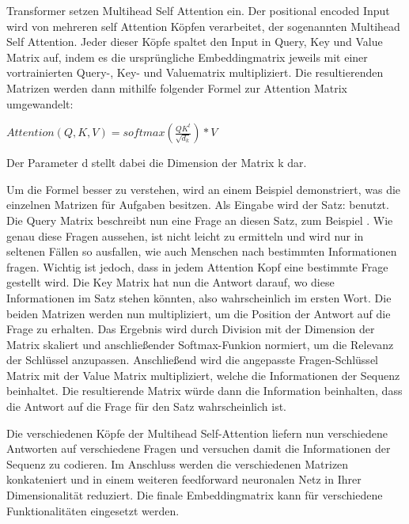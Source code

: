Transformer setzen Multihead Self Attention ein. 
Der positional encoded Input wird von mehreren self Attention Köpfen verarbeitet, der sogenannten Multihead Self Attention. 
Jeder dieser Köpfe spaltet den Input in Query, Key und Value Matrix auf, indem es die ursprüngliche Embeddingmatrix jeweils mit einer vortrainierten Query-, Key- und Valuematrix multipliziert.
Die resultierenden Matrizen werden dann mithilfe folgender Formel zur Attention Matrix umgewandelt:

$Attention(Q,K,V)=softmax(\frac{QK^t}{\sqrt{d_k}})*V$

Der Parameter d stellt dabei die Dimension der Matrix k dar.

Um die Formel besser zu verstehen, wird an einem Beispiel demonstriert, was die einzelnen Matrizen für Aufgaben besitzen.
Als Eingabe wird der Satz:  benutzt.
Die Query Matrix beschreibt nun eine Frage an diesen Satz, zum Beispiel .
Wie genau diese Fragen aussehen, ist nicht leicht zu ermitteln und wird nur in seltenen Fällen so ausfallen, wie auch Menschen nach bestimmten Informationen fragen.
Wichtig ist jedoch, dass in jedem Attention Kopf eine bestimmte Frage gestellt wird.
Die Key Matrix hat nun die Antwort darauf, wo diese Informationen im Satz stehen könnten, also wahrscheinlich im ersten Wort. 
Die beiden Matrizen werden nun multipliziert, um die Position der Antwort auf die Frage zu erhalten. 
Das Ergebnis wird durch Division mit der Dimension der Matrix skaliert und anschließender Softmax-Funkion normiert, um die Relevanz der Schlüssel anzupassen.
Anschließend wird die angepasste Fragen-Schlüssel Matrix mit der Value Matrix multipliziert, welche die Informationen der Sequenz beinhaltet. 
Die resultierende Matrix würde dann die Information beinhalten, dass die Antwort auf die Frage  für den Satz  wahrscheinlich  ist.

Die verschiedenen Köpfe der Multihead Self-Attention liefern nun verschiedene Antworten auf verschiedene Fragen und versuchen damit die Informationen der Sequenz zu codieren.
Im Anschluss werden die verschiedenen Matrizen konkateniert und in einem weiteren feedforward neuronalen Netz in Ihrer Dimensionalität reduziert.
Die finale Embeddingmatrix kann für verschiedene Funktionalitäten eingesetzt werden.

